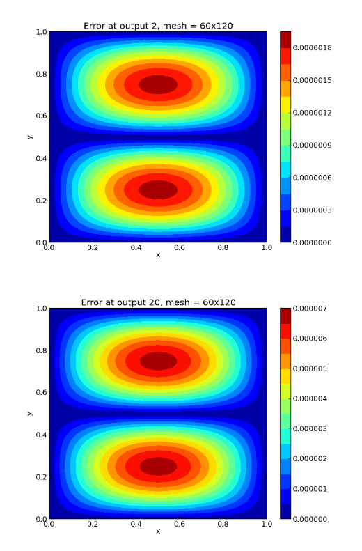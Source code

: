 \documentclass[letterpaper,10pt,english]{sphinxmanual}
\begin{document}
\includegraphics[width=0.300\linewidth]{plot-ark_heat2d_err_2.png}

\includegraphics[width=0.300\linewidth]{plot-ark_heat2d_err_3.png}
\end{document}

